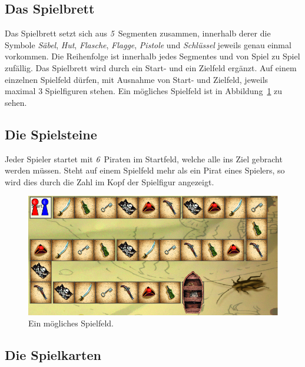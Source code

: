 \documentclass[a4paper, ngerman]{scrartcl}
\newcommand{\SpielSegmenteAnzahl}{\emph{5}}
\newcommand{\PiratenAnzahl}{\emph{6}}
\begin{document}
	\subsection{Das Spielbrett}
Das Spielbrett setzt sich aus \SpielSegmenteAnzahl\ Segmenten zusammen,
innerhalb derer die Symbole \emph{Säbel},  \emph{Hut}, \emph{Flasche},
\emph{Flagge}, \emph{Pistole} und \emph{Schlüssel} jeweils genau einmal
vorkommen.
Die Reihenfolge ist innerhalb jedes Segmentes und von Spiel zu Spiel zufällig.
Das Spielbrett wird durch ein Start- und ein Zielfeld ergänzt.
Auf einem einzelnen Spielfeld dürfen, mit Ausnahme von Start- und Zielfeld,
jeweils maximal 3 Spielfiguren stehen. Ein mögliches Spielfeld ist in
Abbildung~\ref{fig:Spielfeld} zu sehen.


\subsection{Die Spielsteine}
Jeder Spieler startet mit \PiratenAnzahl\ Piraten im Startfeld, welche alle ins
Ziel gebracht werden müssen. Steht auf einem Spielfeld mehr als ein Pirat eines
Spielers, so wird dies durch die Zahl im Kopf der Spielfigur angezeigt.


\begin{figure}[h] \centering \includegraphics[scale = 0.5]{bilder/Spielfeld}
	\caption{Ein mögliches Spielfeld.}
	\label{fig:Spielfeld}
	\end{figure}
	
	\subsection{Die Spielkarten}
	
\end{document}
